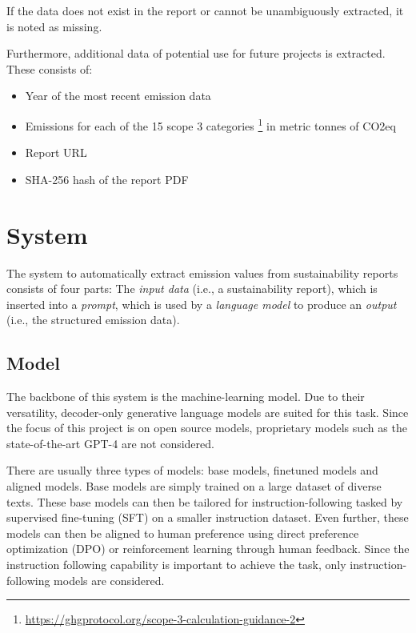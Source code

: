 \documentclass[]{article}
\begin{document}
If the data does not exist in the report or cannot be unambiguously extracted, it is noted as missing.

Furthermore, additional data of potential use for future projects is extracted. These consists of:

\begin{itemize}
	\item Year of the most recent emission data
	\item Emissions for each of the 15 scope 3 categories \footnote{\url{https://ghgprotocol.org/scope-3-calculation-guidance-2}} in metric tonnes of CO2eq
	\item Report URL
	\item SHA-256 hash of the report PDF
\end{itemize}

\section{System}
\label{sec:method}

The system to automatically extract emission values from sustainability reports consists of four parts: The \emph{input data} (i.e., a sustainability report), which is inserted into a \emph{prompt}, which is used by a \emph{language model} to produce an \emph{output} (i.e., the structured emission data).

\subsection{Model}

The backbone of this system is the machine-learning model. Due to their versatility, decoder-only generative language models are suited for this task. Since the focus of this project is on open source models, proprietary models such as the state-of-the-art GPT-4 \cite{DBLP:journals/corr/abs-2303-08774} are not considered.

There are usually three types of models: base models, finetuned models and aligned models. Base models are simply trained on a large dataset of diverse texts. These base models can then be tailored for instruction-following tasked by supervised fine-tuning (SFT) on a smaller instruction dataset. Even further, these models can then be aligned to human preference using direct preference optimization (DPO) \cite{DBLP:conf/nips/RafailovSMMEF23} or reinforcement learning through human feedback. Since the instruction following capability is important to achieve the task, only instruction-following models are considered.
\end{document}
